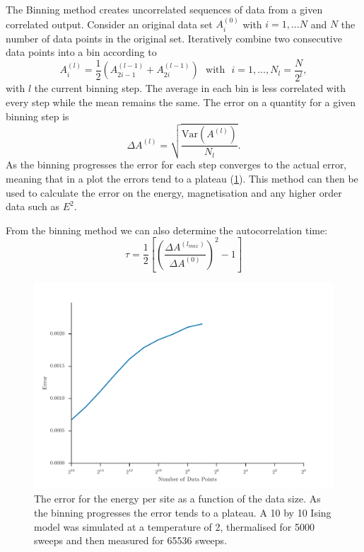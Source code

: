 \documentclass[11pt, a4paper]{report} %
\begin{document}
The Binning method creates uncorrelated sequences of data from a given correlated output.
Consider an original data set \(A_i^{(0)}\) with \(i = 1, \ldots N\) and \(N\) the number of data points in the original set.
Iteratively combine two consecutive data points into a bin according to
\begin{equation}
	A_i^(l) = \frac{1}{2} \left(A_{2i-1}^{(l-1)} + A_{2i}^{(l-1)} \right) \mathrm{\ \ \ with \ \ \ } i = 1, \ldots, N_l = \frac{N}{2^l},
\end{equation}
with \(l\) the current binning step.
The average in each bin is less correlated with every step while the mean remains the same.
The error on a quantity for a given binning step is
\begin{equation}
	\label{eq:basic_error}
	\Delta A^{(l)} = \sqrt{\frac{\mathrm{Var}(A^{(l)})}{N_l}}.
\end{equation}
As the binning progresses the error for each step converges to the actual error, meaning that in a plot the errors tend to a plateau (\cref{fig:binning_error_convergence}).
This method can then be used to calculate the error on the energy, magnetisation and any higher order data such as \(E^2\).

From the binning method we can also determine the autocorrelation time:\cite{corboz}
\begin{equation}
	\tau = \frac{1}{2} \left[\left( \frac{\Delta A^{(l_{max})}}{\Delta A^{(0)}} \right)^2- 1 \right]
\end{equation}
\begin{figure}[htb]
	\centering
	\includegraphics[width=\textwidth]{ising_metropolis_energy_per_site_error_binning.pdf}
	\caption{The error for the energy per site as a function of the data size. As the binning progresses the error tends to a plateau. A 10 by 10 Ising model was simulated at a temperature of 2, thermalised for 5000 sweeps and then measured for 65536 sweeps.}
	\label{fig:binning_error_convergence}
\end{figure}
\end{document}
